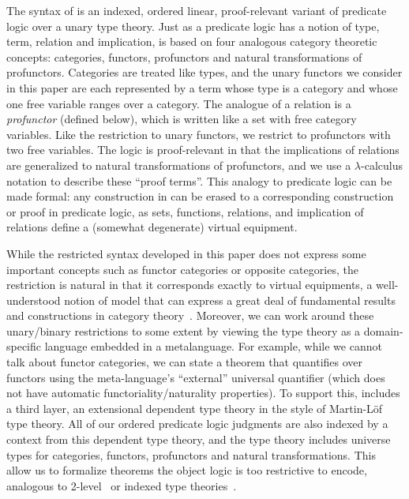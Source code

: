 \documentclass{llncs}
\begin{document}
The syntax of \vett{} is an indexed, ordered linear, proof-relevant
variant of predicate logic over a unary type theory.
%
Just as a predicate logic has a notion of type, term, relation and
implication, \vett{} is based on four analogous category theoretic
concepts: categories, functors, profunctors and natural transformations
of profunctors.
%
Categories are treated like types, and the unary functors we consider in
this paper are each represented by a term whose type is a category and
whose one free variable ranges over a category.
%
The analogue of a relation is a \emph{profunctor} (defined below), which
is written like a set with free category variables.  Like the
restriction to unary functors, we restrict to profunctors with two free
variables.
%
The logic is proof-relevant in that the implications of relations are
generalized to natural transformations of profunctors, and we use a
$\lambda$-calculus notation to describe these ``proof terms''.
%
This analogy to predicate logic can be made formal: any construction in
\vett{} can be erased to a corresponding construction or proof in
predicate logic, as sets, functions, relations, and implication of
relations define a (somewhat degenerate) virtual equipment.

While the restricted syntax developed in this paper does not express
some important concepts such as functor categories or opposite
categories, the restriction is natural in that it corresponds exactly to
virtual equipments, a well-understood notion of model that can express a
great deal of fundamental results and constructions in category
theory~\cite{riehl_verity_2022,Shulman13}.
%
Moreover, we can work around these unary/binary restrictions to some
extent by viewing the type theory as a domain-specific language embedded
in a metalanguage.  For example, while we cannot talk about functor
categories, we can state a theorem that quantifies over functors using
the meta-language's ``external'' universal quantifier (which does not
have automatic functoriality/naturality properties).  To support this,
\vett{} includes a third layer, an extensional dependent type theory in
the style of Martin-L\"of type theory. All of our ordered predicate
logic judgments are also indexed by a context from this dependent
type theory, and the type theory includes universe types for categories,
functors, profunctors and natural transformations.  This allow us to
formalize theorems the object logic is too restrictive to encode, analogous to
2-level~\cite{voevodsky13hts,altenkirch+16strict} or indexed type
theories~\cite{isaev21indexed,cervesatopfenning02llf,vakar15linear,krishnaswami+15linear}.
\end{document}
